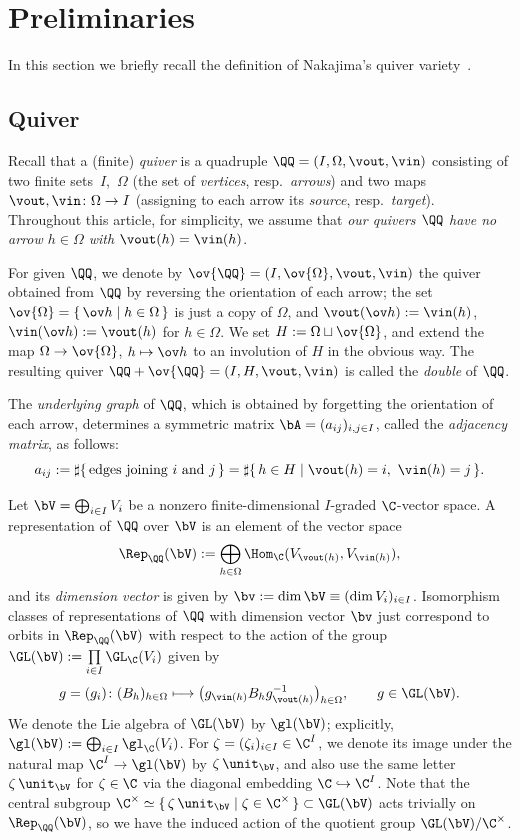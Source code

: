 \section{Preliminaries}\label{sec:pre}

In this section
we brief\/ly recall the def\/inition of Nakajima's quiver variety~\cite{MR1302318}.

\subsection{Quiver}\label{subsec:quiver}

Recall that a (f\/inite) {\em quiver} is a
quadruple $\QQ=(I,\Omega,\vout,\vin)$ consisting of
two f\/inite sets~$I$,~$\Omega$
(the set of {\em vertices}, resp.\ {\em arrows})
and two maps
$\vout, \vin \colon \Omega \to I$
(assigning to each arrow
its {\em source}, resp.\ {\em target}).
Throughout this article, for simplicity,
we assume that {\em our quivers $\QQ$
have no arrow $h \in \Omega$ with $\vout(h)=\vin(h)$}.

For given $\QQ$, we denote by $\ov{\QQ}=(I,\ov{\Omega},\vout,\vin)$
the quiver obtained from $\QQ$ by reversing the orientation of each arrow;
the set $\ov{\Omega}=\{\, \ov h \mid h \in \Omega \,\}$
is just a copy of $\Omega$,
and $\vout(\ov h):=\vin(h)$, $\vin(\ov h):=\vout(h)$
for $h \in \Omega$.
We set $H := \Omega \sqcup \ov{\Omega}$,
and extend the map $\Omega \to \ov{\Omega}$, $h \mapsto \ov h$ to
an involution of $H$ in the obvious way.
The resulting quiver $\QQ + \ov{\QQ} =(I,H,\vout,\vin)$
is called the {\em double} of $\QQ$.

The {\em underlying graph} of $\QQ$,
which is obtained by forgetting the orientation of each arrow,
determines a symmetric matrix $\bA=(a_{ij})_{i,j \in I}$,
called the {\em adjacency matrix}, as follows:
\[
a_{ij} := \sharp\{\,\text{edges joining $i$ and $j$}\,\}
= \sharp\{\, h \in H \mid \vout(h)=i,\ \vin(h)=j \,\}.
\]

Let $\bV=\bigoplus_{i \in I} V_i$ be a nonzero f\/inite-dimensional
$I$-graded $\C$-vector space.
A representation of $\QQ$ over $\bV$ is an element of the vector space
\[
\Rep_\QQ(\bV):= \bigoplus_{h \in \Omega}
\Hom_\C(V_{\vout(h)},V_{\vin(h)}),
\]
and its {\em dimension vector} is given by
$\bv := \dim \bV \equiv (\dim V_i)_{i \in I}$.
Isomorphism classes of representations of $\QQ$ with dimension vector $\bv$
just correspond to orbits in $\Rep_\QQ(\bV)$
with respect to the action of the group
$\GL(\bV):=\prod\limits_{i \in I} \GL_\C(V_i)$ given by
\[
g=(g_i) \colon (B_h)_{h \in \Omega} \longmapsto
\bigl( g_{\vin(h)}B_h g_{\vout(h)}^{-1} \bigr)_{h \in \Omega},
\qquad g \in \GL(\bV).
\]
We denote the Lie algebra of $\GL(\bV)$ by $\gl(\bV)$; explicitly,
$\gl(\bV):=\bigoplus_{i \in I} \gl_\C(V_i)$.
For $\zeta =(\zeta_i)_{i \in I} \in \C^I$,
we denote its image under the natural map $\C^I \to \gl(\bV)$
by $\zeta\,\unit_\bV$,
and also use the same letter $\zeta\,\unit_\bV$
for $\zeta \in \C$ via the diagonal embedding $\C \hookrightarrow \C^I$.
Note that the central subgroup
$\C^\times \simeq
\{\,\zeta\,\unit_\bV \mid \zeta \in \C^\times\,\} \subset \GL(\bV)$
acts trivially on $\Rep_\QQ(\bV)$,
so we have the induced action of the quotient group
$\GL(\bV)/\C^\times$.

